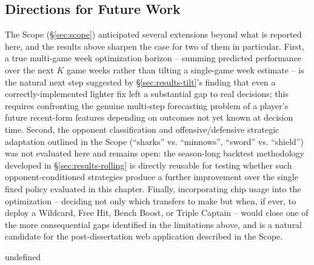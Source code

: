 			\subsection{Directions for Future Work}
				The Scope (\S\ref{sec:scope}) anticipated several extensions beyond what is reported here, and the results above sharpen the case for two of them in particular. First, a true multi-game week optimization horizon -- summing predicted performance over the next $K$ game weeks rather than tilting a single-game week estimate -- is the natural next step suggested by \S\ref{sec:results-tilt}'s finding that even a correctly-implemented lighter fix left a substantial gap to real decisions; this requires confronting the genuine multi-step forecasting problem of a player's future recent-form features depending on outcomes not yet known at decision time. Second, the opponent classification and offensive/defensive strategic adaptation outlined in the Scope (``sharks'' vs. ``minnows'', ``sword'' vs. ``shield'') was not evaluated here and remains open: the season-long backtest methodology developed in \S\ref{sec:results-rolling} is directly reusable for testing whether such opponent-conditioned strategies produce a further improvement over the single fixed policy evaluated in this chapter. Finally, incorporating chip usage into the optimization -- deciding not only which transfers to make but when, if ever, to deploy a Wildcard, Free Hit, Bench Boost, or Triple Captain -- would close one of the more consequential gaps identified in the limitations above, and is a natural candidate for the post-dissertation web application described in the Scope.

	
	




undefined